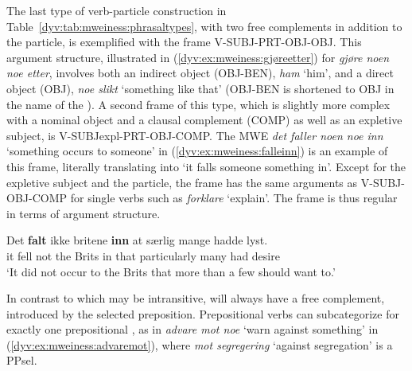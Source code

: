\documentclass[output=paper]{langsci/langscibook}
\begin{document}
The last type of verb-particle construction in Table~\ref{dyv:tab:mweiness:phrasaltypes}, with two free complements in addition to the particle, is exemplified with the frame \textsf{V-SUBJ-PRT-OBJ-OBJ}.
This argument structure, illustrated in (\ref{dyv:ex:mweiness:gjøreetter}) for \emph{gjøre noen noe etter}, involves both an indirect object (\textsf{OBJ-BEN}), \emph{ham} `him', and a direct object (\textsf{OBJ}), \emph{noe slikt} `something like that' (\textsf{OBJ-BEN} is shortened to \textsf{OBJ} in the name of the ).
A second frame of this type, which is slightly more complex with a nominal object and a clausal complement (\textsf{COMP}) as well as an expletive subject, is \textsf{V-SUBJexpl-PRT-OBJ-COMP}. 
The MWE \emph{det faller noen noe inn} `something occurs to someone' in (\ref{dyv:ex:mweiness:falleinn}) is an example of this frame, literally translating into `it falls someone something in'.
Except for the expletive subject and the particle, the frame has the same arguments as \textsf{V-SUBJ-OBJ-COMP} for single verbs such as \emph{forklare} `explain'.
The frame is thus regular in terms of argument structure.   

\ea\label{dyv:ex:mweiness:falleinn}
\gll   Det \textbf{falt} ikke britene \textbf{inn} at særlig mange hadde lyst. \\
        it fell not {the Brits} in that particularly many had desire \\
\glt  `It did not occur to the Brits that more than a few should want to.' \\ 
\z

In contrast to  which may be intransitive,  will always have a free complement, introduced by the selected preposition.
Prepositional verbs can subcategorize for exactly one prepositional , as in
\emph{advare mot noe} `warn against something' in (\ref{dyv:ex:mweiness:advaremot}), where \emph{mot segregering} `against segregation' is a \textsf{PPsel}. 
\end{document}
